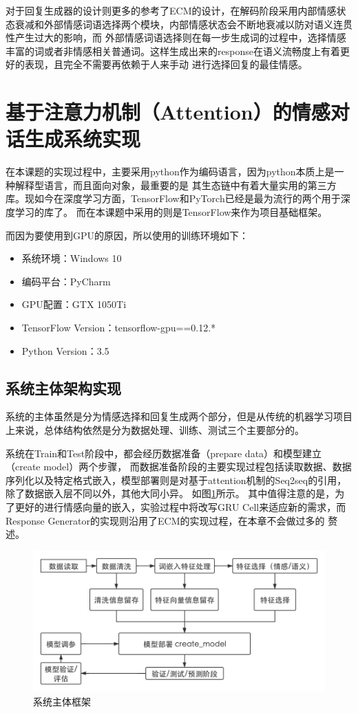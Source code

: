\documentclass[supercite]{HustGraduPaper}
\theoremstyle{definition}
\begin{document}
对于回复生成器的设计则更多的参考了ECM\cite{DBLP:journals/corr/ZhouHZZL17}的设计，在解码阶段采用内部情感状态衰减和外部情感词语选择两个模块，内部情感状态会不断地衰减以防对语义连贯性产生过大的影响，而
外部情感词语选择则在每一步生成词的过程中，选择情感丰富的词或者非情感相关普通词。这样生成出来的response在语义流畅度上有着更好的表现，且完全不需要再依赖于人来手动
进行选择回复的最佳情感。

\section{基于注意力机制（Attention）的情感对话生成系统实现}
在本课题的实现过程中，主要采用python作为编码语言，因为python本质上是一种解释型语言，而且面向对象，最重要的是
其生态链中有着大量实用的第三方库。现如今在深度学习方面，TensorFlow和PyTorch已经是最为流行的两个用于深度学习的库了。
而在本课题中采用的则是TensorFlow来作为项目基础框架。

而因为要使用到GPU的原因，所以使用的训练环境如下：
\begin{itemize}
  \item 系统环境：Windows 10
  \item 编码平台：PyCharm
  \item GPU配置：GTX 1050Ti
  \item TensorFlow Version：tensorflow-gpu==0.12.*
  \item Python Version：3.5
\end{itemize}

\subsection{系统主体架构实现}
系统的主体虽然是分为情感选择和回复生成两个部分，但是从传统的机器学习项目上来说，总体结构依然是分为数据处理、训练、测试三个主要部分的。

系统在Train和Test阶段中，都会经历数据准备（prepare data）和模型建立（create model）两个步骤，
而数据准备阶段的主要实现过程包括读取数据、数据序列化以及特定格式嵌入，模型部署则是对基于attention机制的Seq2seq的引用，除了数据嵌入层不同以外，其他大同小异。
如图\ref{Fig.main}所示。
其中值得注意的是，为了更好的进行情感向量的嵌入，实验过程中将改写GRU Cell来适应新的需求，而Response Generator的实现则沿用了ECM的实现过程，在本章不会做过多的
赘述。
\begin{figure}[H] %
  \centering %
  \includegraphics[width=1\textwidth]{images/main.png} %
  \caption{系统主体框架} %
  \label{Fig.main} %
\end{figure}
\end{document}

